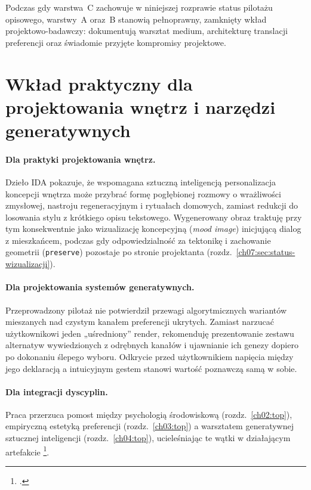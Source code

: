 Podczas gdy warstwa~C zachowuje w niniejszej rozprawie status pilotażu opisowego, warstwy~A oraz~B stanowią pełnoprawny, zamknięty wkład projektowo-badawczy: dokumentują warsztat medium, architekturę translacji preferencji oraz świadomie przyjęte kompromisy projektowe.

\section{Wkład praktyczny dla projektowania wnętrz i narzędzi generatywnych}
\label{ch09:sec:praktyka}

\paragraph{Dla praktyki projektowania wnętrz.}
Dzieło IDA pokazuje, że wspomagana sztuczną inteligencją personalizacja koncepcji wnętrza może przybrać formę pogłębionej rozmowy o wrażliwości zmysłowej, nastroju regeneracyjnym i rytuałach domowych, zamiast redukcji do losowania stylu z krótkiego opisu tekstowego. Wygenerowany obraz traktuję przy tym konsekwentnie jako wizualizację koncepcyjną (\emph{mood image}) inicjującą dialog z mieszkańcem, podczas gdy odpowiedzialność za tektonikę i zachowanie geometrii (\texttt{preserve}) pozostaje po stronie projektanta (rozdz.~\ref{ch07:sec:status-wizualizacji}).

\paragraph{Dla projektowania systemów generatywnych.}
Przeprowadzony pilotaż nie potwierdził przewagi algorytmicznych wariantów mieszanych nad czystym kanałem preferencji ukrytych. Zamiast narzucać użytkownikowi jeden „uśredniony” render, rekomenduję prezentowanie zestawu alternatyw wywiedzionych z odrębnych kanałów i ujawnianie ich genezy dopiero po dokonaniu ślepego wyboru. Odkrycie przed użytkownikiem napięcia między jego deklaracją a intuicyjnym gestem stanowi wartość poznawczą samą w sobie.

\paragraph{Dla integracji dyscyplin.}
Praca przerzuca pomost między psychologią środowiskową (rozdz.~\ref{ch02:top}), empiryczną estetyką preferencji (rozdz.~\ref{ch03:top}) a warsztatem generatywnej sztucznej inteligencji (rozdz.~\ref{ch04:top}), ucieleśniając te wątki w działającym artefakcie \footcite{idaPlatform2026}.

